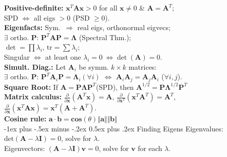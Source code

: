 \documentclass[10pt,landscape]{article}
\makeatletter
\renewcommand{\subsection}{\@startsection{subsection}{2}{0mm}%
                                {-1ex plus -.5ex minus -.2ex}%
                                {0.5ex plus .2ex}%
                                {\normalfont\small\bfseries}}
\makeatother
\begin{document}
\begin{multicols}{3}
\smallskip
\textbf{Positive-definite:} $\mathbf{x}^T \mathbf{A} \mathbf{x} > 0$ for all $\mathbf{x}\neq 0$ \& $\mathbf{A} = \mathbf{A}^T$;\\
\hspace*{1em} SPD $\Leftrightarrow$ all eigs $>0$ (PSD $\ge0$).\\
\smallskip
\textbf{Eigenfacts:} Sym.\ $\Rightarrow$ real eigs, orthonormal eigvecs; \\
\hspace*{1em} $\exists$ ortho. $\mathbf{P}$: $\mathbf{P}^T \mathbf{A} \mathbf{P} = \mathbf{\Lambda}$ (Spectral Thm.);\\
\hspace*{1em} $\det = \prod \lambda_i$, $\mathrm{tr} = \sum\lambda_i$;\\
\hspace*{1em} Singular $\Leftrightarrow$ at least one $\lambda_i = 0 \ \Leftrightarrow \det(\mathbf{A}) = 0$.\\
\smallskip
\textbf{Simult. Diag.:} Let $\mathbf{A}_i$ be symm. $k \times k$ matrices:\\
\hspace*{1em} $\exists$ ortho. $\mathbf{P}$: $\mathbf{P}^T \mathbf{A}_i \mathbf{P} = \mathbf{\Lambda}_i (\forall i)$ $\Leftrightarrow$ $\mathbf{A}_i \mathbf{A}_j=\mathbf{A}_j\mathbf{A}_i$ ($\forall i,j$).\\
\smallskip
\textbf{Square Root:} If $\mathbf A= \mathbf P\boldsymbol\Lambda\mathbf P^T$(SPD), then $\mathbf A^{1/2}= \mathbf P\boldsymbol\Lambda^{1/2}\mathbf P^T$\\
\smallskip
\textbf{Matrix calculus:} $\frac{\partial}{\partial \mathbf{x}}(\mathbf{A}^T \mathbf{x}) = \mathbf{A}$, 
$\frac{\partial}{\partial \mathbf{x}^T}(\mathbf{x}^T \mathbf{A}^T) = \mathbf{A}^T$, 
$\frac{\partial}{\partial \mathbf{x}}(\mathbf{x}^T \mathbf{A} \mathbf{x}) = \mathbf{x}^T(\mathbf{A}+\mathbf{A}^T)$.\\
\medskip
\textbf{Cosine rule:} $\mathbf{a}\cdot\mathbf{b} = \mathbf{cos}(\theta)\Vert \mathbf{a}\Vert\Vert \mathbf{b}\Vert$\\
\medskip
\subsection{Finding Eigens}
Eigenvalues: $\mathrm{det}(\mathbf A-\lambda\mathbf I) = 0$, solve for $\lambda$.\\
Eigenvectors: $(\mathbf A-\lambda\mathbf I)\mathbf v=0$, solve for $ \mathbf v$ for each $\lambda$.\\
\medskip

\end{multicols}
\end{document}

